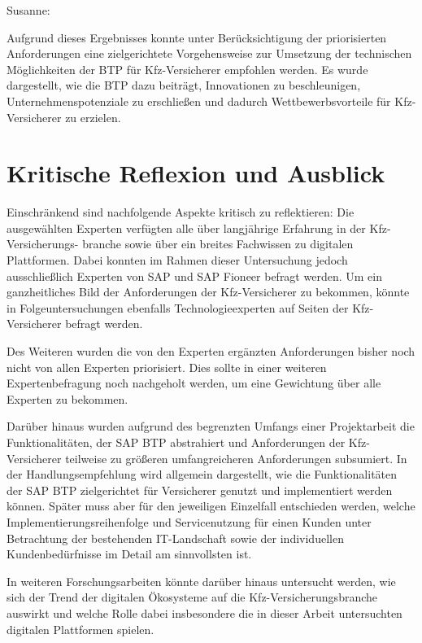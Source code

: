Susanne: 

Aufgrund dieses Ergebnisses konnte unter Berücksichtigung der priorisierten Anforderungen eine zielgerichtete Vorgehensweise zur Umsetzung der technischen Möglichkeiten der BTP für Kfz-Versicherer empfohlen werden. Es wurde dargestellt, wie die BTP dazu beiträgt, Innovationen zu beschleunigen, Unternehmenspotenziale zu erschließen und dadurch Wettbewerbsvorteile für Kfz-Versicherer zu erzielen.

\section{Kritische Reflexion und Ausblick}

Einschränkend sind nachfolgende Aspekte kritisch zu reflektieren: Die ausgewählten Experten verfügten alle über langjährige Erfahrung in der Kfz-Versicherungs- branche sowie über ein breites Fachwissen zu digitalen Plattformen. Dabei konnten im Rahmen dieser Untersuchung jedoch ausschließlich Experten von SAP und SAP Fioneer befragt werden. Um ein ganzheitliches Bild der Anforderungen der Kfz-Versicherer zu bekommen, könnte in Folgeuntersuchungen ebenfalls Technologieexperten auf Seiten der Kfz-Versicherer befragt werden. 

Des Weiteren wurden die von den Experten ergänzten Anforderungen bisher noch nicht von allen Experten priorisiert. Dies sollte in einer weiteren Expertenbefragung noch nachgeholt werden, um eine Gewichtung über alle Experten zu bekommen. 


Darüber hinaus wurden aufgrund des begrenzten Umfangs einer Projektarbeit die Funktionalitäten, der SAP BTP abstrahiert und Anforderungen der Kfz-Versicherer teilweise zu größeren umfangreicheren Anforderungen subsumiert. In der Handlungsempfehlung wird allgemein dargestellt, wie die Funktionalitäten der SAP BTP zielgerichtet für Versicherer genutzt und implementiert werden können. Später muss aber für den jeweiligen Einzelfall entschieden werden, welche Implementierungsreihenfolge und Servicenutzung für einen Kunden unter Betrachtung der bestehenden IT-Landschaft sowie der individuellen Kundenbedürfnisse im Detail am sinnvollsten ist.

In weiteren Forschungsarbeiten könnte darüber hinaus untersucht werden, wie sich der Trend der digitalen Ökosysteme auf die Kfz-Versicherungsbranche auswirkt und welche Rolle dabei insbesondere die in dieser Arbeit untersuchten digitalen Plattformen spielen.


